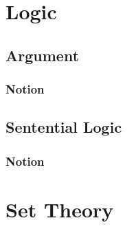 \documentclass{book}
\begin{document}
\maketitle
\tableofcontents
\part{Logic}
	\chapter{Argument}
		\section{Notion}
		
	\chapter{Sentential Logic}
		\section{Notion}
		
\part{Set Theory}
\end{document}
